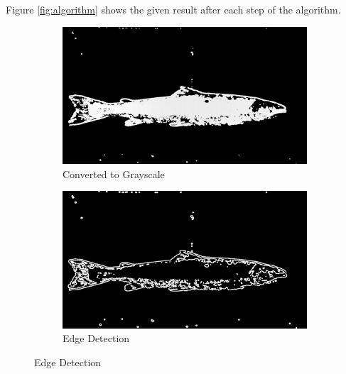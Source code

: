 Figure \ref{fig:algorithm} shows the given result after each step of the algorithm.


\begin{figure}[H]
    \begin{subfigure}{0.49\textwidth}
        \includegraphics[width=\linewidth]{images/implementation/4_1_grayscale}
        \caption{Converted to Grayscale} 
        \label{fig:grayscale}
    \end{subfigure}\hspace*{\fill}
    \begin{subfigure}{0.49\textwidth}
        \includegraphics[width=\linewidth]{images/implementation/4_2_edge_detector}
        \caption{Edge Detection} 
        \label{fig:edge_detection}
    \end{subfigure}
    

\end{figure}
